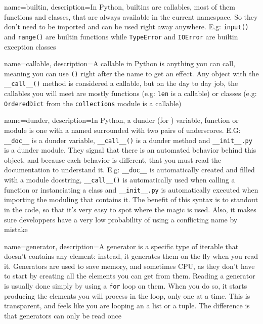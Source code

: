\makeglossaries


{
    name=builtin,
    description={In Python, builtins are \glspl{callable}, most of them functions and classes, that are always available in the current namespace. So they don't need to be imported and can be used right away anywhere. E.g: \lstinline{input()} and \lstinline{range()} are builtin functions while \lstinline{TypeError} and \lstinline{IOError} are builtin exception classes}
}


{
    name=callable,
    description={A callable in Python is anything you can call, meaning you can use \lstinline{()} right after the name to get an effect. Any object with the \lstinline{__call__()} method is considered a callable, but on the day to day job, the callables you will meet are mostly functions (e.g: \lstinline{len} is a callable) or classes (e.g: \lstinline{OrderedDict} from the \lstinline{collections} module is a callable)}
}

{
    name=dunder,
    description={In Python, a dunder (for ) variable, function or module is one with a named surrounded with two pairs of underscores. E.G: \lstinline{__doc__} is a dunder variable, \lstinline{__call__()} is a dunder method and \lstinline{__init__.py} is a dunder module. They signal that there is an automated behavior behind this object, and because each behavior is different, that you must read the documentation to understand it. E.g: \lstinline{__doc__} is automatically created and filled with a module docstring, \lstinline{__call__()} is automatically used when calling a function or instanciating a class and \lstinline{__init__.py} is automatically executed when importing the moduling that contains it. The benefit of this syntax is to standout in the code, so that it's very easy to spot where the magic is used. Also, it makes sure developpers have a very low probability of using a conflicting name by mistake}
}

{
    name=generator,
    description={A generator is a specific type of \gls{iterable} that doesn't contains any element: instead, it generates them on the fly when you read it. Generators are used to save memory, and sometimes CPU, as they don't have to start by creating all the elements you can get from them. Reading a generator is usually done simply by using a \lstinline{for} loop on them. When you do so, it starts producing the elements you will process in the loop, only one at a time. This is transparent, and feels like you are looping an a list or a tuple. The difference is that generators can only be read once}
}


